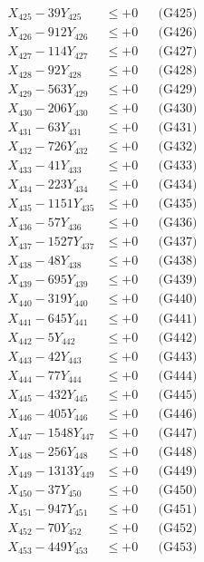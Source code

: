 \documentclass[a4paper,10pt]{article}
\begin{document}
{\begin{align}
X_{425} - 39Y_{425} &\leq +0 && \text{(G425)} \\
X_{426} - 912Y_{426} &\leq +0 && \text{(G426)} \\
X_{427} - 114Y_{427} &\leq +0 && \text{(G427)} \\
X_{428} - 92Y_{428} &\leq +0 && \text{(G428)} \\
X_{429} - 563Y_{429} &\leq +0 && \text{(G429)} \\
X_{430} - 206Y_{430} &\leq +0 && \text{(G430)} \\
\allowbreak
X_{431} - 63Y_{431} &\leq +0 && \text{(G431)} \\
X_{432} - 726Y_{432} &\leq +0 && \text{(G432)} \\
X_{433} - 41Y_{433} &\leq +0 && \text{(G433)} \\
X_{434} - 223Y_{434} &\leq +0 && \text{(G434)} \\
X_{435} - 1151Y_{435} &\leq +0 && \text{(G435)} \\
X_{436} - 57Y_{436} &\leq +0 && \text{(G436)} \\
X_{437} - 1527Y_{437} &\leq +0 && \text{(G437)} \\
X_{438} - 48Y_{438} &\leq +0 && \text{(G438)} \\
X_{439} - 695Y_{439} &\leq +0 && \text{(G439)} \\
X_{440} - 319Y_{440} &\leq +0 && \text{(G440)} \\
\allowbreak
X_{441} - 645Y_{441} &\leq +0 && \text{(G441)} \\
X_{442} - 5Y_{442} &\leq +0 && \text{(G442)} \\
X_{443} - 42Y_{443} &\leq +0 && \text{(G443)} \\
X_{444} - 77Y_{444} &\leq +0 && \text{(G444)} \\
X_{445} - 432Y_{445} &\leq +0 && \text{(G445)} \\
X_{446} - 405Y_{446} &\leq +0 && \text{(G446)} \\
X_{447} - 1548Y_{447} &\leq +0 && \text{(G447)} \\
X_{448} - 256Y_{448} &\leq +0 && \text{(G448)} \\
X_{449} - 1313Y_{449} &\leq +0 && \text{(G449)} \\
X_{450} - 37Y_{450} &\leq +0 && \text{(G450)} \\
\allowbreak
X_{451} - 947Y_{451} &\leq +0 && \text{(G451)} \\
X_{452} - 70Y_{452} &\leq +0 && \text{(G452)} \\
X_{453} - 449Y_{453} &\leq +0 && \text{(G453)} \\

\end{align}}
\end{document}

